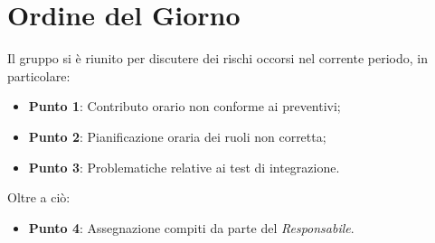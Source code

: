 \section{Ordine del Giorno}
Il gruppo si è riunito per discutere dei rischi occorsi nel corrente periodo, in particolare:
\begin{itemize}
	\item \textbf{Punto 1}: Contributo orario non conforme ai preventivi;
	\item \textbf{Punto 2}: Pianificazione oraria dei ruoli non corretta;
	\item \textbf{Punto 3}: Problematiche relative ai test di integrazione.
\end{itemize}
Oltre a ciò:
\begin{itemize}
	\item \textbf{Punto 4}: Assegnazione compiti da parte del \textit{Responsabile}.
\end{itemize}
